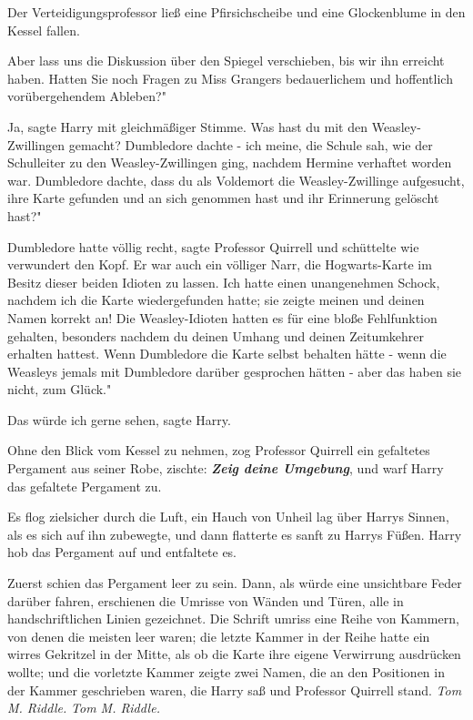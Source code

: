Der Verteidigungsprofessor ließ eine Pfirsichscheibe und eine Glockenblume in
den Kessel fallen.

\glqq{}Aber lass uns die Diskussion über den Spiegel verschieben, bis wir ihn
erreicht haben. Hatten Sie noch Fragen zu Miss Grangers bedauerlichem und
hoffentlich vorübergehendem Ableben?"

\glqq{}Ja\grqq{}, sagte Harry mit gleichmäßiger Stimme. \glqq{}Was hast du mit den
Weasley-Zwillingen gemacht? Dumbledore dachte - ich meine, die Schule sah, wie
der Schulleiter zu den Weasley-Zwillingen ging, nachdem Hermine verhaftet worden
war. Dumbledore dachte, dass du als Voldemort die Weasley-Zwillinge aufgesucht,
ihre Karte gefunden und an sich genommen hast und ihr Erinnerung gelöscht hast?"

\glqq{}Dumbledore hatte völlig recht\grqq{}, sagte Professor Quirrell und
schüttelte wie verwundert den Kopf. \glqq{}Er war auch ein völliger Narr, die
Hogwarts-Karte im Besitz dieser beiden Idioten zu lassen. Ich hatte einen
unangenehmen Schock, nachdem ich die Karte wiedergefunden hatte; sie zeigte
meinen und deinen Namen korrekt an! Die Weasley-Idioten hatten es für eine bloße
Fehlfunktion gehalten, besonders nachdem du deinen Umhang und deinen
Zeitumkehrer erhalten hattest. Wenn Dumbledore die Karte selbst behalten hätte -
wenn die Weasleys jemals mit Dumbledore darüber gesprochen hätten - aber das
haben sie nicht, zum Glück."

\glqq{}Das würde ich gerne sehen\grqq{}, sagte Harry.

Ohne den Blick vom Kessel zu nehmen, zog Professor Quirrell ein gefaltetes
Pergament aus seiner Robe, zischte: \glqq{}\textbf{\emph{Zeig deine
Umgebung}}\grqq{}, und warf Harry das gefaltete Pergament zu.

Es flog zielsicher durch die Luft, ein Hauch von Unheil lag über Harrys Sinnen,
als es sich auf ihn zubewegte, und dann flatterte es sanft zu Harrys Füßen.
Harry hob das Pergament auf und entfaltete es.

Zuerst schien das Pergament leer zu sein. Dann, als würde eine unsichtbare Feder
darüber fahren, erschienen die Umrisse von Wänden und Türen, alle in
handschriftlichen Linien gezeichnet. Die Schrift umriss eine Reihe von Kammern,
von denen die meisten leer waren; die letzte Kammer in der Reihe hatte ein
wirres Gekritzel in der Mitte, als ob die Karte ihre eigene Verwirrung
ausdrücken wollte; und die vorletzte Kammer zeigte zwei Namen, die an den
Positionen in der Kammer geschrieben waren, die Harry saß und Professor Quirrell
stand. \emph{ Tom M. Riddle.}
\emph{Tom M. Riddle.}

